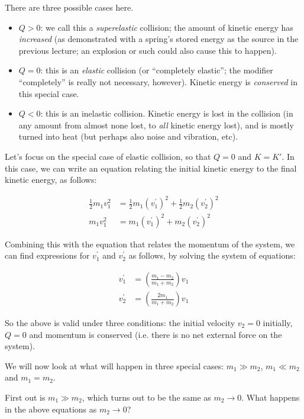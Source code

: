 There are three possible cases here.

\begin{itemize}
\item $Q > 0$: we call this a \emph{superelastic} collision; the amount of kinetic energy has \emph{increased} (as demonstrated with a spring's stored energy as the source in the previous lecture; an explosion or such could also cause this to happen).
\item $Q = 0$: this is an \emph{elastic} collision (or ``completely elastic''; the modifier ``completely'' is really not necessary, however). Kinetic energy is \emph{conserved} in this special case.
\item $Q < 0$: this is an inelastic collision. Kinetic energy is lost in the collision (in any amount from almost none lost, to \emph{all} kinetic energy lost), and is mostly turned into heat (but perhaps also noise and vibration, etc).
\end{itemize}

Let's focus on the special case of elastic collision, so that $Q = 0$ and $K = K'$. In this case, we can write an equation relating the initial kinetic energy to the final kinetic energy, as follows:

\begin{align}
\frac{1}{2} m_1 v_1^2 &= \frac{1}{2} m_1 (v_1^{'})^2 + \frac{1}{2} m_2 (v_2^{'})^2\\
m_1 v_1^2 &= m_1 (v_1^{'})^2 + m_2 (v_2^{'})^2
\end{align}

Combining this with the equation that relates the momentum of the system, we can find expressions for $v_1^{'}$ and $v_2^{'}$ as follows, by solving the system of equations:

\begin{align}
v_1^{'} &= \left(\frac{m_1 - m_2}{m_1 + m_2}\right) v_1\\
v_2^{'} &= \left(\frac{2 m_1}{m_1 + m_2}\right) v_1
\end{align}

So the above is valid under three conditions: the initial velocity $v_2 = 0$ initially, $Q = 0$ and momentum is conserved (i.e. there is no net external force on the system).

We will now look at what will happen in three special cases: $m_1 \gg m_2$, $m_1 \ll m_2$ and $m_1 = m_2$.

First out is $m_1 \gg m_2$, which turns out to be the same as $m_2 \to 0$. What happens in the above equations as $m_2 \to 0$?

